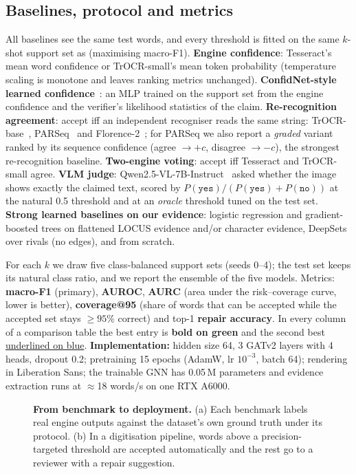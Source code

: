 \subsection{Baselines, protocol and metrics}
All baselines see the same test words, and every threshold is fitted on the same $k$-shot support set as \ours{}
(maximising macro-F1). \textbf{Engine confidence}: Tesseract's mean word confidence or TrOCR-small's mean token
probability (temperature scaling is monotone and leaves ranking metrics unchanged). \textbf{ConfidNet-style learned
confidence}~\cite{corbiere2019confidnet}: an MLP trained on the support set from the engine confidence and the
verifier's likelihood statistics of the claim. \textbf{Re-recognition agreement}: accept iff an independent recogniser
reads the same string: TrOCR-base~\cite{li2023trocr}, PARSeq~\cite{bautista2022parseq} and
Florence-2~\cite{xiao2024florence}; for PARSeq we also report a \emph{graded} variant ranked by its sequence
confidence (agree $\rightarrow +c$, disagree $\rightarrow -c$), the strongest re-recognition baseline.
\textbf{Two-engine voting}: accept iff Tesseract and TrOCR-small agree. \textbf{VLM judge}:
Qwen2.5-VL-7B-Instruct~\cite{bai2025qwen25vl} asked whether the image shows exactly the claimed text, scored by
$P(\texttt{yes})/(P(\texttt{yes})+P(\texttt{no}))$ at the natural 0.5 threshold and at an \emph{oracle} threshold tuned on
the test set. \textbf{Strong learned baselines on our evidence}: logistic regression and gradient-boosted trees on
flattened LOCUS evidence and/or character evidence, DeepSets over rivals (no edges), and \ours{} from scratch.

For each $k$ we draw five class-balanced support sets (seeds 0--4); the test set keeps its natural class ratio, and we
report the ensemble of the five models. Metrics: \textbf{macro-F1} (primary), \textbf{AUROC}, \textbf{AURC} (area
under the risk--coverage curve, lower is better), \textbf{coverage@95} (share of words that can be accepted while the
accepted set stays $\geq95\%$ correct) and top-1 \textbf{repair accuracy}. In every column of a comparison table the
best entry is \colorbox{bestc}{\textbf{bold on green}} and the second best \colorbox{secondc}{\underline{underlined on
blue}}. \textbf{Implementation:} hidden size 64, 3 GATv2 layers with 4 heads, dropout 0.2; pretraining 15 epochs (AdamW,
lr $10^{-3}$, batch 64); rendering in Liberation Sans; the trainable GNN has 0.05\,M parameters and evidence extraction
runs at $\approx$18 words/s on one RTX A6000.

\begin{figure}[t]\centering
\resizebox{0.95\linewidth}{!}{}
\caption{\textbf{From benchmark to deployment.} (a) Each benchmark labels real engine outputs against the dataset's own
ground truth under its protocol. (b) In a digitisation pipeline, words above a precision-targeted threshold are
accepted automatically and the rest go to a reviewer with a repair suggestion.}
\label{fig:pipeline}
\end{figure}
